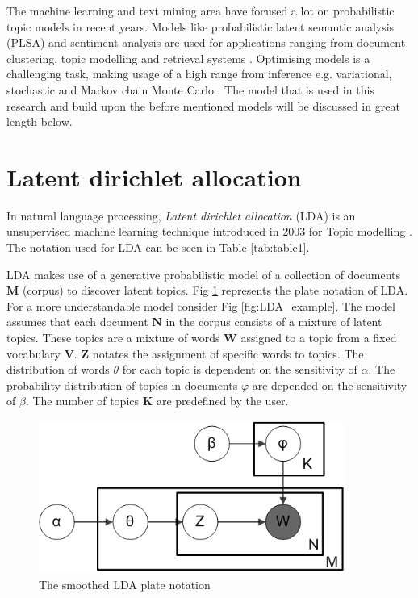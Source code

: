 The machine learning and text mining area have focused a lot on probabilistic topic models in recent years. Models like probabilistic latent semantic analysis (PLSA) and sentiment analysis are used for applications ranging from document clustering, topic modelling and retrieval systems \cite{Lu2011InvestigatingLDA}. Optimising models is a challenging task, making usage of a high range from inference e.g. variational, stochastic and Markov chain Monte Carlo \cite{Hoffman2016MarkovModels}. The model that is used in this research and build upon the before mentioned models will be discussed in great length below.


\section{Latent dirichlet allocation}\label{lda:lda}
In natural language processing, \textit{Latent dirichlet allocation} (LDA) is an unsupervised machine learning technique introduced in 2003 for Topic modelling \cite{Blei2003LatentAllocation}. The notation used for LDA can be seen in Table \ref{tab:table1}. 

LDA makes use of a generative probabilistic model of a collection of documents \textbf{M} (corpus) to discover latent topics. Fig \ref{fig:LDA} represents the plate notation of LDA. For a more understandable model consider Fig \ref{fig:LDA_example}. The model assumes that each document \textbf{N} in the corpus consists of a mixture of latent topics. These topics are a mixture of words \textbf{W} assigned to a topic from a fixed vocabulary \textbf{V}. \textbf{Z} notates the assignment of specific words to topics. The distribution of words $\theta$ for each topic is dependent on the sensitivity of $\alpha$. The probability distribution of topics in documents $\varphi$ are depended on the sensitivity of $\beta$. The number of topics \textbf{K} are predefined by the user. 

\begin{figure}
    \centering
    \includegraphics[width=10cm, height=5cm]{methodology/Smoothed_LDA.png}
    \caption{The smoothed LDA plate notation}
    \label{fig:LDA}
\end{figure}

